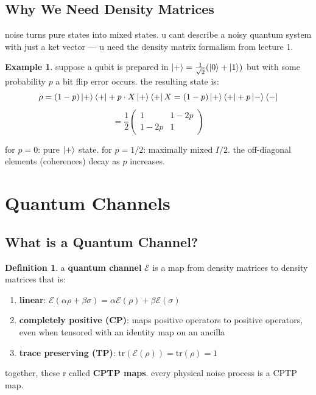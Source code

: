 \documentclass[11pt,a4paper]{article}
\theoremstyle{definition}
\newtheorem{definition}{Definition}[section]
\newtheorem{example}{Example}[section]
\theoremstyle{remark}
\begin{document}
\subsection{Why We Need Density Matrices}

noise turns pure states into mixed states. u cant describe a noisy quantum system with just a ket vector --- u need the density matrix formalism from lecture 1.

\begin{example}
suppose a qubit is prepared in $\ket{+} = \frac{1}{\sqrt{2}}(\ket{0} + \ket{1})$ but with some probability $p$ a bit flip error occurs. the resulting state is:
\[
\rho = (1-p)\ket{+}\bra{+} + p \cdot X\ket{+}\bra{+}X = (1-p)\ket{+}\bra{+} + p\ket{-}\bra{-}
\]
\[
= \frac{1}{2}\begin{pmatrix} 1 & 1-2p \\ 1-2p & 1 \end{pmatrix}
\]

for $p = 0$: pure $\ket{+}$ state. for $p = 1/2$: maximally mixed $I/2$. the off-diagonal elements (coherences) decay as $p$ increases.
\end{example}

\section{Quantum Channels}

\subsection{What is a Quantum Channel?}

\begin{definition}
a \textbf{quantum channel} $\mathcal{E}$ is a map from density matrices to density matrices that is:
\begin{enumerate}[label=(\roman*)]
    \item \textbf{linear}: $\mathcal{E}(\alpha\rho + \beta\sigma) = \alpha\mathcal{E}(\rho) + \beta\mathcal{E}(\sigma)$
    \item \textbf{completely positive (CP)}: maps positive operators to positive operators, even when tensored with an identity map on an ancilla
    \item \textbf{trace preserving (TP)}: $\text{tr}(\mathcal{E}(\rho)) = \text{tr}(\rho) = 1$
\end{enumerate}
together, these r called \textbf{CPTP maps}. every physical noise process is a CPTP map.
\end{definition}
\end{document}
